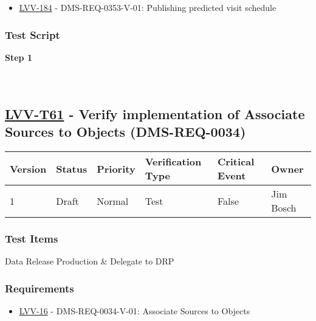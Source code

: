 \begin{itemize}
\tightlist
\item
  \href{https://jira.lsstcorp.org/browse/LVV-184}{LVV-184} -
  DMS-REQ-0353-V-01: Publishing predicted visit schedule
\end{itemize}

\hypertarget{test-script-37}{%
\subsubsection{Test Script}\label{test-script-37}}

\textbf{Step 1}\\
~\\
~\\

\hypertarget{lvv-t61---verify-implementation-of-associate-sources-to-objects-dms-req-0034}{%
\subsection{\texorpdfstring{\href{https://jira.lsstcorp.org/secure/Tests.jspa\#/testCase/LVV-T61}{LVV-T61}
- Verify implementation of Associate Sources to Objects
(DMS-REQ-0034)}{LVV-T61 - Verify implementation of Associate Sources to Objects (DMS-REQ-0034)}}\label{lvv-t61---verify-implementation-of-associate-sources-to-objects-dms-req-0034}}

\begin{longtable}[]{@{}llllll@{}}
\toprule
Version & Status & Priority & Verification Type & Critical Event &
Owner\tabularnewline
\midrule
\endhead
1 & Draft & Normal & Test & False & Jim Bosch\tabularnewline
\bottomrule
\end{longtable}

\hypertarget{test-items-37}{%
\subsubsection{Test Items}\label{test-items-37}}

Data Release Production \& Delegate to DRP

\hypertarget{requirements-38}{%
\subsubsection{Requirements}\label{requirements-38}}

\begin{itemize}
\tightlist
\item
  \href{https://jira.lsstcorp.org/browse/LVV-16}{LVV-16} -
  DMS-REQ-0034-V-01: Associate Sources to Objects
\end{itemize}

